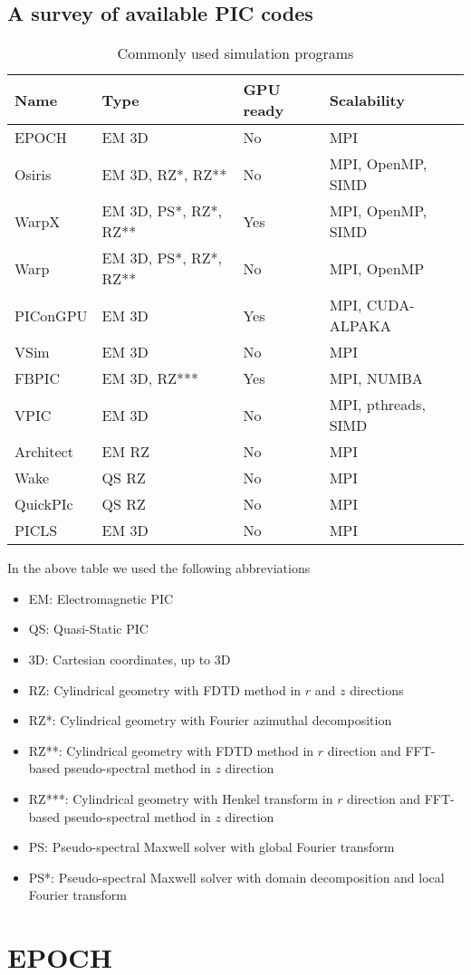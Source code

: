 \documentclass[12pt, class=report, crop=false]{standalone}
\begin{document}
\subsection{A survey of available PIC codes}


\begin{table}
  \begin{tabular}{l l l l}
  \toprule
  \textbf{Name} & \textbf{Type} & \textbf{GPU ready} & \textbf{Scalability}\\
  \midrule
  EPOCH & EM 3D & No & MPI\\
  Osiris & EM 3D, RZ*, RZ** & No & MPI, OpenMP, SIMD\\
  WarpX & EM 3D, PS*, RZ*, RZ** & Yes & MPI, OpenMP, SIMD\\
  Warp & EM 3D, PS*, RZ*, RZ** & No & MPI, OpenMP\\
  PIConGPU & EM 3D & Yes & MPI, CUDA-ALPAKA\\
  VSim & EM 3D & No & MPI\\
  FBPIC & EM 3D, RZ*** & Yes & MPI, NUMBA\\
  VPIC & EM 3D & No & MPI, pthreads, SIMD\\
  Architect & EM RZ & No & MPI\\
  Wake & QS RZ & No & MPI\\
  QuickPIc & QS RZ & No & MPI\\
  PICLS & EM 3D & No & MPI\\
  \bottomrule
  \end{tabular}
  \caption{Commonly used simulation programs}%
  \label{tab:pic-software}
\end{table}

In the above table we used the following abbreviations
\begin{itemize}
    \item EM: Electromagnetic PIC
    \item QS: Quasi-Static PIC
    \item 3D: Cartesian coordinates, up to 3D
    \item RZ: Cylindrical geometry with FDTD method in \(r\) and \(z\) directions
    \item RZ*: Cylindrical geometry with Fourier azimuthal decomposition
    \item RZ**: Cylindrical geometry with FDTD method in \(r\) direction
                and FFT-based pseudo-spectral method in \(z\) direction
    \item RZ***: Cylindrical geometry with Henkel transform in \(r\) direction
                and FFT-based pseudo-spectral method in \(z\) direction
    \item PS: Pseudo-spectral Maxwell solver with global Fourier transform
    \item PS*: Pseudo-spectral Maxwell solver with domain decomposition and local Fourier transform
\end{itemize}


\section{EPOCH}
\end{document}
